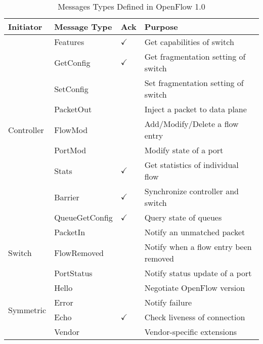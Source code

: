 \begin{table}[t]
\centering
\caption{Messages Types Defined in OpenFlow 1.0}%
\begin{tabular}{@{}llll@{}}
\toprule
Initiator                   & Message Type   & Ack          & Purpose                               \\ \midrule
\multirow{9}{*}{Controller} & Features       & $\checkmark$ & Get capabilities of switch            \\
                            & GetConfig      & $\checkmark$ & Get fragmentation setting of switch   \\
                            & SetConfig      &              & Set fragmentation setting of switch   \\
                            & PacketOut      &              & Inject a packet to data plane         \\
                            & FlowMod        &              & Add/Modify/Delete a flow entry        \\
                            & PortMod        &              & Modify state of a port                \\
                            & Stats          & $\checkmark$ & Get statistics of individual flow     \\
                            & Barrier        & $\checkmark$ & Synchronize controller and switch     \\
                            & QueueGetConfig & $\checkmark$ & Query state of queues                 \\ \midrule
\multirow{3}{*}{Switch}     & PacketIn       &              & Notify an unmatched packet            \\
                            & FlowRemoved    &              & Notify when a flow entry been removed \\
                            & PortStatus     &              & Notify status update of a port        \\ \midrule
\multirow{4}{*}{Symmetric}  & Hello          &              & Negotiate OpenFlow version            \\
                            & Error          &              & Notify failure                        \\
                            & Echo           & $\checkmark$ & Check liveness of connection          \\
                            & Vendor         &              & Vendor-specific extensions            \\ \bottomrule
\end{tabular}
\end{table}

